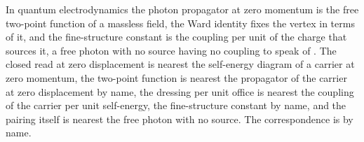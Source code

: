 \begin{chbridge}
In quantum electrodynamics the photon propagator at zero momentum is the free two-point function of a massless field, the Ward identity fixes the vertex in terms of it, and the fine-structure constant is the coupling per unit of the charge that sources it, a free photon with no source having no coupling to speak of \cite{Ward1950,Dyson1949,Peskin1995}. The closed read at zero displacement is nearest the self-energy diagram of a carrier at zero momentum, the two-point function is nearest the propagator of the carrier at zero displacement by name, the dressing per unit office is nearest the coupling of the carrier per unit self-energy, the fine-structure constant by name, and the pairing itself is nearest the free photon with no source. The correspondence is by name.
\end{chbridge}
